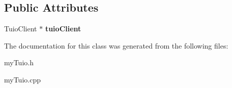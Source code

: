\subsection*{Public Attributes}
\begin{DoxyCompactItemize}
\item 
\hypertarget{classpho_1_1MyTuioListener_a2068c8b36e67dd5582b0b495c5d477e6}{Tuio\-Client $\ast$ {\bfseries tuio\-Client}}\label{classpho_1_1MyTuioListener_a2068c8b36e67dd5582b0b495c5d477e6}

\end{DoxyCompactItemize}


The documentation for this class was generated from the following files\-:\begin{DoxyCompactItemize}
\item 
my\-Tuio.\-h\item 
my\-Tuio.\-cpp\end{DoxyCompactItemize}

